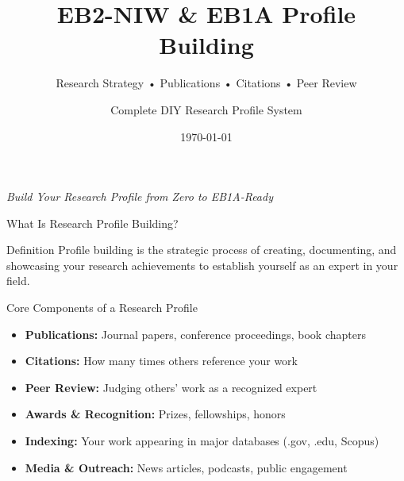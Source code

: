 \documentclass[11pt]{beamer}
\title{EB2-NIW \& EB1A Profile Building}
\subtitle{Research Strategy • Publications • Citations • Peer Review}
\author{Complete DIY Research Profile System}
\date{\today}
\begin{document}
	
	\begin{frame}
		\titlepage
		\centering
		\scriptsize \textit{Build Your Research Profile from Zero to EB1A-Ready}
	\end{frame}
	
	\begin{frame}{What Is Research Profile Building?}
		\scriptsize
		\begin{block}{Definition}
			Profile building is the strategic process of creating, documenting, and showcasing your research achievements to establish yourself as an expert in your field.
		\end{block}
		\begin{block}{Core Components of a Research Profile}
			\begin{itemize}
				\item \textbf{Publications:} Journal papers, conference proceedings, book chapters
				\item \textbf{Citations:} How many times others reference your work
				\item \textbf{Peer Review:} Judging others' work as a recognized expert
				\item \textbf{Awards \& Recognition:} Prizes, fellowships, honors
				\item \textbf{Indexing:} Your work appearing in major databases (.gov, .edu, Scopus)
				\item \textbf{Media \& Outreach:} News articles, podcasts, public engagement
			\end{itemize}
		\end{block}
	\end{frame}
	
\end{document}
